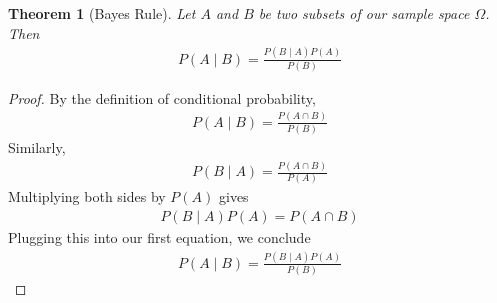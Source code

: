 \documentclass[11pt,letterpaper]{article}
\newtheorem{theorem}{Theorem}
\numberwithin{theorem}{section}
\numberwithin{definition}{section}
\numberwithin{lemma}{section}
\numberwithin{corollary}{section}
\numberwithin{proposition}{section}
\theoremstyle{definition}
\numberwithin{remark}{section}
\numberwithin{claim}{section}
\numberwithin{observation}{section}
\numberwithin{fact}{section}
\numberwithin{assumption}{section}
\numberwithin{example}{section}
\numberwithin{exercise}{section}
\begin{document}
\begin{theorem}[Bayes Rule]
Let $A$ and $B$ be two subsets of our sample space $\Omega$. Then
\begin{align*}
P(A \mid B) = \frac{P(B \mid A) P(A)}{P(B)}
\end{align*}
\end{theorem}

\begin{proof}
By the definition of conditional probability,
\begin{align*}
P(A \mid B) = \frac{P(A \cap B)}{P(B)}
\end{align*}
Similarly,
\begin{align*}
P(B \mid A) = \frac{P(A \cap B)}{P(A)}
\end{align*}
Multiplying both sides by $P(A)$ gives
\begin{align*}
P(B \mid A)P(A) = P(A \cap B)
\end{align*}
Plugging this into our first equation, we conclude
\begin{align*}
P(A \mid B) = \frac{P(B \mid A) P(A)}{P(B)}
\end{align*}
\end{proof}
\end{document}
